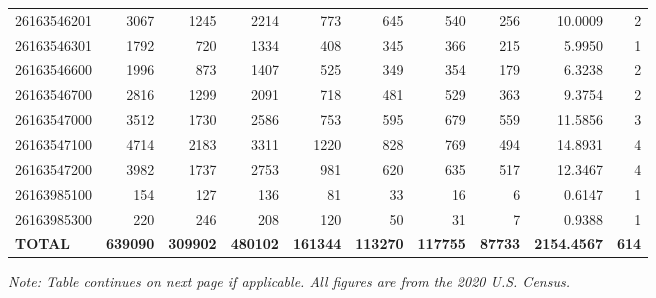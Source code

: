 \documentclass[11pt,landscape]{article}
\begin{document}
{\begin{longtable}[]{@{}lrrrrrrrrr@{}}
26163546201 & 3067 & 1245 & 2214 & 773 & 645 & 540 & 256 & 10.0009 & 2 \\
26163546301 & 1792 & 720 & 1334 & 408 & 345 & 366 & 215 & 5.9950 & 1 \\
26163546600 & 1996 & 873 & 1407 & 525 & 349 & 354 & 179 & 6.3238 & 2 \\
26163546700 & 2816 & 1299 & 2091 & 718 & 481 & 529 & 363 & 9.3754 & 2 \\
26163547000 & 3512 & 1730 & 2586 & 753 & 595 & 679 & 559 & 11.5856 & 3 \\
26163547100 & 4714 & 2183 & 3311 & 1220 & 828 & 769 & 494 & 14.8931 & 4 \\
26163547200 & 3982 & 1737 & 2753 & 981 & 620 & 635 & 517 & 12.3467 & 4 \\
26163985100 & 154 & 127 & 136 & 81 & 33 & 16 & 6 & 0.6147 & 1 \\
26163985300 & 220 & 246 & 208 & 120 & 50 & 31 & 7 & 0.9388 & 1 \\
\midrule
\textbf{TOTAL} & \textbf{639090} & \textbf{309902} & \textbf{480102} & \textbf{161344} & \textbf{113270} & \textbf{117755} & \textbf{87733} & \textbf{2154.4567} & \textbf{614} \\
\bottomrule
\end{longtable}
}

{\small \textit{Note: Table continues on next page if applicable. All figures are from the 2020 U.S. Census.}}
\end{document}
